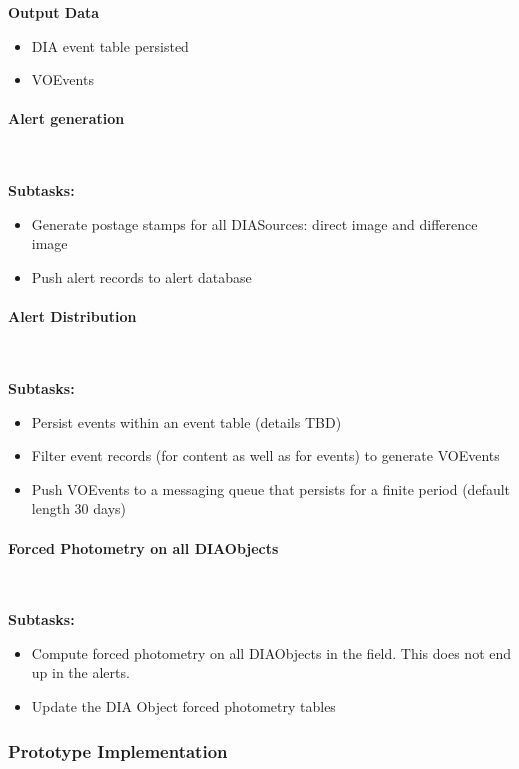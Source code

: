 {\bf Output Data}\\
\begin{itemize}
\item DIA event table persisted
\item VOEvents
\end{itemize}

\paragraph{Alert generation}~

\noindent
{\bf Subtasks:}
\begin{itemize}
\item Generate postage stamps for all DIASources: direct image and difference image
\item Push alert records to alert database
\end{itemize}

\paragraph{Alert Distribution}~

\noindent
{\bf Subtasks:}
\begin{itemize}
\item Persist events within an event table (details TBD)
\item Filter event records (for content as well as for events) to
  generate VOEvents
\item Push VOEvents to a messaging queue that persists for a finite
  period (default length 30 days)
\end{itemize}

\paragraph{Forced Photometry on all DIAObjects}~

\noindent
{\bf Subtasks:}
\begin{itemize}
\item Compute forced photometry on all DIAObjects in the field.  This
  does not end up in the alerts.
\item Update the DIA Object forced photometry tables
\end{itemize}

\subsubsection{Prototype Implementation}

